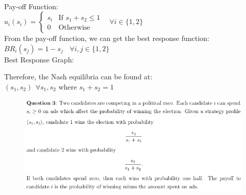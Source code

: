 \documentclass[12pt]{article}
\newenvironment{solution}[2][Solution]{\begin{trivlist}
\item[\hskip \labelsep {\bfseries #1}]}{\end{trivlist}}
\begin{document}
\begin{solution}{}~\\

Pay-off Function:\\

$
u_i(s_i)=\left\{\begin{array}{ll}
s_i & \text{If }s_1+s_2\leq1\\
0 & \text{Otherwise}
\end{array}\right.\ \ \ \ \forall i\in\{1,2\}$\\

From the pay-off function, we can get the best response function:\\

$BR_i(s_j)=1-s_j\ \ \ \ \forall i,j\in\{1,2\}$\\

Best Response Graph:\\


Therefore, the Nash equilibria can be found at:\\

$(s_1,s_2)\ \ \forall s_1,s_2\text{ where }s_1+s_2=1$
\end{solution}

\begin{figure}[h!]
\includegraphics[width=\linewidth]{./assets/201805201648.png}
\includegraphics[width=\linewidth]{./assets/201805201649.png}
\end{figure}
\end{document}
